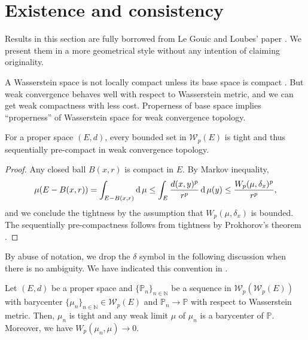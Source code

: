 \section{Existence and consistency}

Results in this section are fully borrowed from Le Gouic and Loubes' paper \cite{le2017existence}.
We present them in a more geometrical style without any intention of claiming originality.

A Wasserstein space is not locally compact unless its base space is compact \cite[Remark 7.1.9]{ambrosio2005gradient}.
But weak convergence behaves well with respect to Wasserstein metric, and we can get weak compactness with less cost.
Properness of base space implies ``properness'' of Wasserstein space for weak convergence topology.

\begin{prop}
	\label{prop:proper_weakly_convergence_topology}
	For a proper space $(E,d)$,
	every bounded set in $\mathcal{W}_p(E)$ is tight and thus
	sequentially	pre-compact in weak convergence topology.
\end{prop}

\begin{proof}
	Any closed ball $B(x,r)$ is compact in $E$.
	By Markov inequality,
	\[
		\mu(E - B(x,r)) = \int_{E - B(x,r)} \operatorname{d} \mu \leq
		\int_{E} \frac{d(x, y)^p}{r^p} \operatorname{d} \mu(y) \leq  \frac{W_p(\mu, \delta_x)^p}{r^p},
	\]
	and we conclude the tightness by the assumption that $W_p( \mu, \delta_x)$ is bounded.
	The sequentially pre-compactness follows from tightness by Prokhorov's theorem
	\cite[Theorem 8.6.2]{Bogachev2007}.
\end{proof}

By abuse of notation, we drop the $\delta$ symbol in the following discussion when there is no ambiguity.
We have indicated this convention in .
\begin{thm}
	\label{thm:consistency_barycenter_Wasserstein}
	Let $(E,d)$ be a proper space and $\{\mathbb{P}_n\}_{n \in \mathbb{N} }$  be a sequence in $\mathcal{W}_p(\mathcal{W}_p(E))$
	with barycenter $\{\mu_n\}_{n \in \mathbb{N} } \in \mathcal{W}_p(E)$ and $\mathbb{P}_n \rightarrow \mathbb{P}$ with respect to Wasserstein metric.
	Then, $\mu_n$ is tight and any weak limit $\mu$ of $\mu_n$ is a barycenter of $\mathbb{P}$.
	Moreover, we have $W_p(\mu_n, \mu) \rightarrow 0$.
\end{thm}


